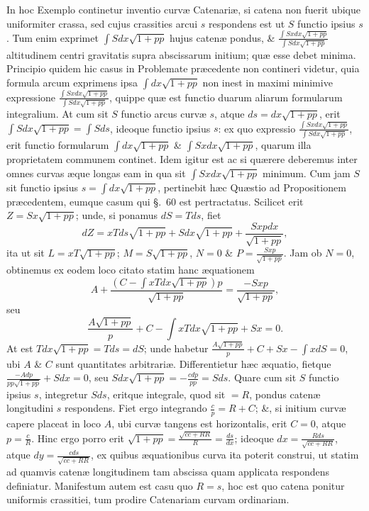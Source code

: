 In hoc Exemplo continetur inventio curvæ Catenariæ, si catena non fuerit ubique uniformiter crassa, sed cujus crassities arcui $s$ respondens est ut $S$ functio ipsius $s$. Tum enim exprimet $\int Sdx\sqrt{1+pp}$ hujus catenæ pondus, \& $\frac{\int Sxdx\sqrt{1+pp}}{\int Sdx\sqrt{1+pp}}$ altitudinem centri gravitatis supra abscissarum initium; quæ esse debet minima. Principio quidem hic casus in Problemate præcedente non contineri videtur, quia formula arcum exprimens ipsa $\int dx\sqrt{1+pp}$ non inest in maximi minimive expressione $\frac{\int Sxdx\sqrt{1+pp}}{\int Sdx\sqrt{1+pp}}$, quippe quæ est functio duarum aliarum formularum integralium. At cum sit $S$ functio arcus curvæ $s$, atque $ds=dx\sqrt{1+pp}$, erit $\int Sdx\sqrt{1+pp}=\int Sds$, ideoque functio ipsius $s$: ex quo expressio $\frac{\int Sxdx\sqrt{1+pp}}{\int Sdx\sqrt{1+pp}}$, erit functio formularum $\int dx\sqrt{1+pp}$ \& $\int Sxdx\sqrt{1+pp}$, quarum illa proprietatem communem continet. Idem igitur est ac si quærere deberemus inter omnes curvas æque longas eam in qua sit $\int Sxdx\sqrt{1+pp}$ minimum. Cum jam $S$ sit functio ipsius $s=\int dx\sqrt{1+pp}$, pertinebit hæc Quæstio ad Propositionem præcedentem, eumque casum qui §.~60 est pertractatus. Scilicet erit $Z=Sx\sqrt{1+pp}$; unde, si ponamus $dS=Tds$, fiet
\[dZ=xTds\sqrt{1+pp}+Sdx\sqrt{1+pp}+\frac{Sxpdx}{\sqrt{1+pp}},\]
ita ut sit $L=xT\sqrt{1+pp}$; $M=S\sqrt{1+pp}$, $N=0$ \& $P=\frac{Sxp}{\sqrt{1+pp}}$. Jam ob $N=0$, obtinemus ex eodem loco citato statim hanc æquationem
\[A+\frac{(C-\int xTdx\sqrt{1+pp})p}{\sqrt{1+pp}}=\frac{-Sxp}{\sqrt{1+pp}},\]
seu
\[\frac{A\sqrt{1+pp}}p+C-\int xTdx\sqrt{1+pp}+Sx=0.\]
At est $Tdx\sqrt{1+pp}=Tds=dS$; unde habetur $\frac{A\sqrt{1+pp}}p+C+Sx-\int xdS=0$, ubi $A$ \& $C$ sunt quantitates arbitrariæ. Differentietur hæc æquatio, fietque $\frac{-Adp}{pp\sqrt{1+pp}}+Sdx=0$, seu $Sdx\sqrt{1+pp}=-\frac{cdp}{pp}=Sds$. Quare cum sit $S$ functio
ipsius $s$, integretur $Sds$, eritque integrale, quod sit $=R$, pondus catenæ longitudini $s$ respondens. Fiet ergo integrando $\frac cp=R+C$; \&, si initium curvæ capere placeat in loco $A$, ubi curvæ tangens est horizontalis, erit $C=0$, atque $p=\frac cR$. Hinc ergo porro erit $\sqrt{1+pp}=\frac{\sqrt{cc+RR}}R=\frac{ds}{dx}$; ideoque $dx=\frac{Rds}{\sqrt{cc+RR}}$, atque $dy=\frac{cds}{\sqrt{cc+RR}}$, ex quibus æquationibus curva ita poterit construi, ut statim ad quamvis catenæ longitudinem tam abscissa quam applicata respondens definiatur. Manifestum autem est casu quo $R=s$, hoc est quo catena ponitur uniformis crassitiei, tum prodire Catenariam curvam ordinariam.

